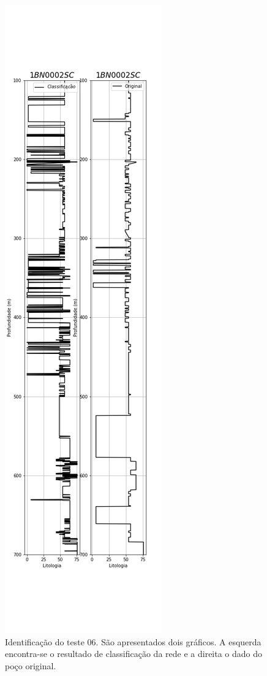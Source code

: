 \begin{figure}[H]
	\centering
	\includegraphics[scale=0.4]{Imagens/result01.png}
	\caption{Identificação do teste 06. São apresentados dois gráficos. A esquerda encontra-se o resultado de classificação da rede e a direita o dado do poço original.}
	\label{IDt06}
\end{figure} 

